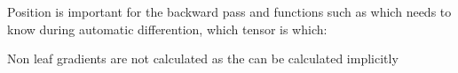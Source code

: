 \begin{notebox}[Notes]\nospacing
    \begin{itemizenosep}
        \item Position is important for the backward pass and functions such as  which needs to know during automatic differention, which tensor is which: 
        \item Non leaf gradients are not calculated as the can be calculated implicitly
    \end{itemizenosep}
\end{notebox}
